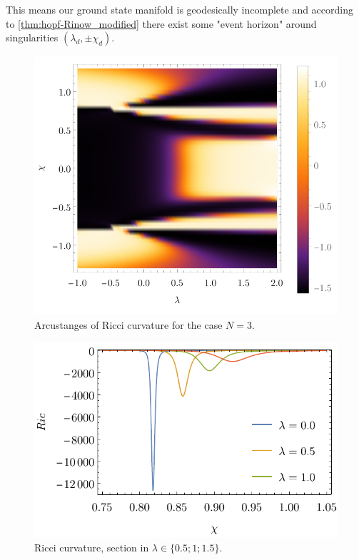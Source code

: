 This means our ground state manifold is geodesically incomplete and according to \ref{thm:hopf-Rinow_modified} there exist some "event horizon" around singularities $(\lambda_d,\pm \chi_d)$. 
\begin{figure}[h]
    \centering
    \includegraphics{../img/N=3_Ricci.pdf}
    \caption{Arcustanges of Ricci curvature for the case $N=3$.}
    \label{fig:N=3_Ricci}
\end{figure}
\begin{figure}[h]
    \centering
    \includegraphics{../img/N=3_Ricci_section.pdf}
    \caption{Ricci curvature, section in $\lambda\in\{0.5;1;1.5\}$.}
    \label{fig:N=3_Ricci_section}
\end{figure}
